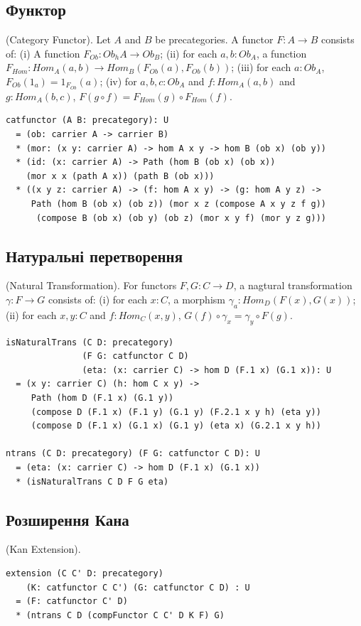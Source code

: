 \begin{definition}
\subsection{Функтор}
\begin{definition} (Category Functor). Let $A$ and $B$ be precategories.
A functor $F : A \rightarrow B$ consists of: (i) A function $F_{Ob}: Ob_hA \rightarrow Ob_B$;
(ii) for each $a,b:Ob_A$, a function $F_{Hom}:Hom_A(a,b)\rightarrow Hom_B(F_{Ob}(a),F_{Ob}(b))$;
(iii) for each $a:Ob_A$, $F_{Ob}(1_a) = 1_{F_{Ob}}(a)$;
(iv) for $a,b,c:Ob_A$ and $f: Hom_A(a,b)$ and $g: Hom_A(b,c)$, $F(g\circ f) = F_{Hom}(g)\circ F_{Hom}(f)$.
\begin{lstlisting}
catfunctor (A B: precategory): U
  = (ob: carrier A -> carrier B)
  * (mor: (x y: carrier A) -> hom A x y -> hom B (ob x) (ob y))
  * (id: (x: carrier A) -> Path (hom B (ob x) (ob x))
    (mor x x (path A x)) (path B (ob x)))
  * ((x y z: carrier A) -> (f: hom A x y) -> (g: hom A y z) ->
     Path (hom B (ob x) (ob z)) (mor x z (compose A x y z f g))
      (compose B (ob x) (ob y) (ob z) (mor x y f) (mor y z g)))
\end{lstlisting}
\end{definition}

\subsection{Натуральні перетворення}
\begin{definition} (Natural Transformation).
For functors $F,G: C \rightarrow D$,
a nagtural transformation $\gamma: F \rightarrow G$ consists of:
(i) for each $x:C$, a morphism $\gamma_a : Hom_D(F(x),G(x))$;
(ii) for each $x,y:C$ and $f: Hom_C(x,y)$, $G(f)\circ \gamma_x = \gamma_y \circ F(g)$.
\begin{lstlisting}
isNaturalTrans (C D: precategory)
               (F G: catfunctor C D)
               (eta: (x: carrier C) -> hom D (F.1 x) (G.1 x)): U
  = (x y: carrier C) (h: hom C x y) ->
     Path (hom D (F.1 x) (G.1 y))
     (compose D (F.1 x) (F.1 y) (G.1 y) (F.2.1 x y h) (eta y))
     (compose D (F.1 x) (G.1 x) (G.1 y) (eta x) (G.2.1 x y h))

ntrans (C D: precategory) (F G: catfunctor C D): U
  = (eta: (x: carrier C) -> hom D (F.1 x) (G.1 x))
  * (isNaturalTrans C D F G eta)
\end{lstlisting}
\end{definition}

\subsection{Розширення Кана}
\begin{definition} (Kan Extension).
\begin{lstlisting}
extension (C C' D: precategory)
    (K: catfunctor C C') (G: catfunctor C D) : U
  = (F: catfunctor C' D)
  * (ntrans C D (compFunctor C C' D K F) G)
\end{lstlisting}
\end{definition}


\end{definition}
